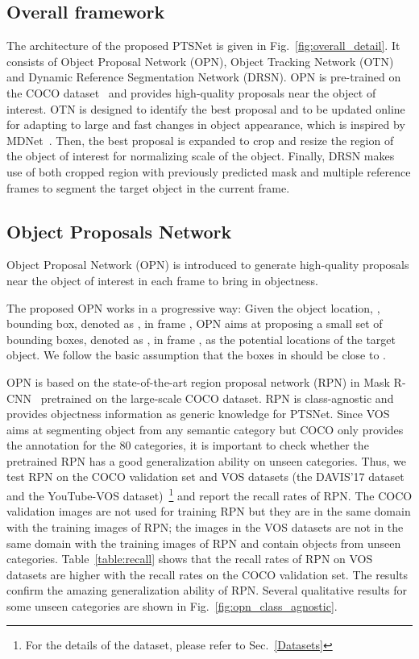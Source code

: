 \documentclass[10pt,twocolumn,letterpaper]{article}
\begin{document}
\subsection{Overall framework}

The architecture of the proposed PTSNet is given in Fig.~\ref{fig:overall_detail}.
It consists of
Object Proposal Network (OPN),
Object Tracking Network (OTN)
and Dynamic Reference Segmentation Network (DRSN).
OPN is pre-trained on the COCO dataset~\cite{lin2014microsoft} and provides high-quality proposals near the object of interest. OTN is designed to identify the best proposal and to be updated online for adapting to large and fast changes in object appearance, which is inspired by MDNet~\cite{mdnet_cvpr16}. Then, the best proposal is expanded to crop and resize the region of the object of interest for normalizing scale of the object. Finally, DRSN makes use of both cropped region with previously predicted mask and multiple reference frames to segment the target object in the current frame. 

\subsection{Object Proposals Network} \label{OPN}
Object Proposal Network (OPN) is introduced to generate high-quality proposals near the object of interest in each frame to bring in objectness.

The proposed OPN works in a progressive way: Given the object location, \ie, bounding box, denoted as , in frame , OPN aims at proposing a small set of bounding boxes, denoted as , in frame , as the potential locations of the target object. We follow the basic assumption that the boxes in  should be close to .

OPN is based on the state-of-the-art region proposal network (RPN) in Mask R-CNN~\cite{mask_rcnn_iccv17} pretrained on the large-scale COCO dataset. RPN is class-agnostic and provides objectness information as generic knowledge for PTSNet. Since VOS aims at segmenting object from any semantic category but COCO only provides the annotation for the 80 categories, it is important to check whether the pretrained RPN has a good generalization ability on unseen categories. Thus, we test RPN on the COCO validation set and VOS datasets (the DAVIS'17 dataset and the YouTube-VOS dataset)~\footnote{For the details of the dataset, please refer to Sec.~\ref{Datasets}} and report the recall rates of RPN. The COCO validation images are not used for training RPN but they are in the same domain with the training images of RPN; the images in the VOS datasets are not in the same domain with the training images of RPN and contain objects from unseen categories. Table~\ref{table:recall} shows that the recall rates of RPN on VOS datasets are higher with the recall rates on the COCO validation set. The results confirm the amazing generalization ability of RPN. Several qualitative results for some unseen categories are shown in Fig.~\ref{fig:opn_class_agnostic}.
\end{document}
